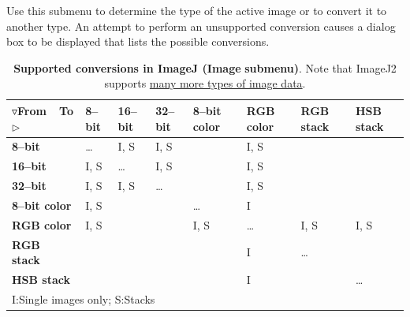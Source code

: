 Use this submenu to determine the type of the active image or to convert
it to another type. An attempt to perform an unsupported conversion
causes a dialog box to be displayed that lists the possible conversions.
\begin{table}[h]
\noindent \caption{\textbf{Supported conversions in ImageJ (}\textsf{\textbf{Image}}\textbf{\lyxarrow{}
submenu)}.  Note that ImageJ2 supports \protect\href{http://developer.imagej.net/imagej2-pixel-types}{many more types of image data}.}


\noindent %
\begin{tabular}{l>{\centering}m{1.25cm}>{\centering}m{1.25cm}>{\centering}m{1.25cm}>{\centering}m{1.25cm}>{\centering}m{1.25cm}>{\centering}m{1.25cm}>{\centering}m{1.25cm}}
\toprule 
\multirow{1}{*}{{\small $\triangledown$From\ \ To$\triangleright$}} & \textbf{\small 8--bit} & \textbf{\small 16--bit} & \textbf{\small 32--bit} & \textbf{\small 8--bit color} & \textbf{\small RGB color} & \textbf{\small RGB stack} & \textbf{\small HSB stack}\tabularnewline
\midrule
\textbf{\small 8--bit} & \ldots{} & {\small I, S} & {\small I, S} &  & {\small I, S} &  & \tabularnewline
\textbf{\small 16--bit} & {\small I, S} & \ldots{} & {\small I, S} &  & {\small I, S} &  & \tabularnewline
\textbf{\small 32--bit} & {\small I, S} & {\small I, S} & \ldots{} &  & {\small I, S} &  & \tabularnewline
\textbf{\small 8--bit color} & {\small I, S} &  &  & \ldots{} & {\small I} &  & \tabularnewline
\textbf{\small RGB color} & {\small I, S} &  &  & {\small I, S} & \ldots{} & {\small I, S} & {\small I, S}\tabularnewline
\textbf{\small RGB stack\ } &  &  &  &  & {\small I} & \ldots{} & \tabularnewline
\textbf{\small HSB stack} &  &  &  &  & {\small I} &  & \ldots{}\tabularnewline
\midrule
\multicolumn{8}{l}{{\small I:\enskip{}Single images only; \enskip{}S:\enskip{}Stacks}}\tabularnewline
\end{tabular}
\end{table}

